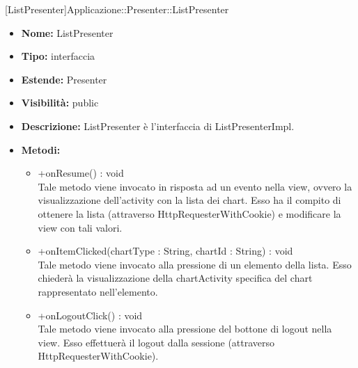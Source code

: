 			
			[ListPresenter]{Applicazione::Presenter::ListPresenter}
			

	
			
			\begin{itemize}
			\item \textbf{Nome:} ListPresenter
			\item \textbf{Tipo:} interfaccia
			
		\item \textbf{Estende:}
		Presenter
			\item \textbf{Visibilità:} public
			\item \textbf{Descrizione:} ListPresenter è l'interfaccia di ListPresenterImpl.
			\item \textbf{Metodi:}
				\begin{itemize}
				\setlength{\itemsep}{5pt}
				
					\item[\ding{111}] {{+onResume() : void}} \\ [1mm] Tale metodo viene invocato in risposta ad un evento nella view, ovvero la visualizzazione dell'activity con la lista dei chart. Esso ha il compito di ottenere la lista (attraverso HttpRequesterWithCookie) e modificare la view con tali valori.
					\item[\ding{111}] {{+onItemClicked(chartType : String, chartId : String) : void}} \\ [1mm] Tale metodo viene invocato alla pressione di un elemento della lista. Esso chiederà la visualizzazione della chartActivity specifica del chart rappresentato nell'elemento.
					\item[\ding{111}] {{+onLogoutClick() : void}} \\ [1mm] Tale metodo viene invocato alla pressione del bottone di logout nella view. Esso effettuerà il logout dalla sessione (attraverso HttpRequesterWithCookie).
				\end{itemize}
		
			\end{itemize}

